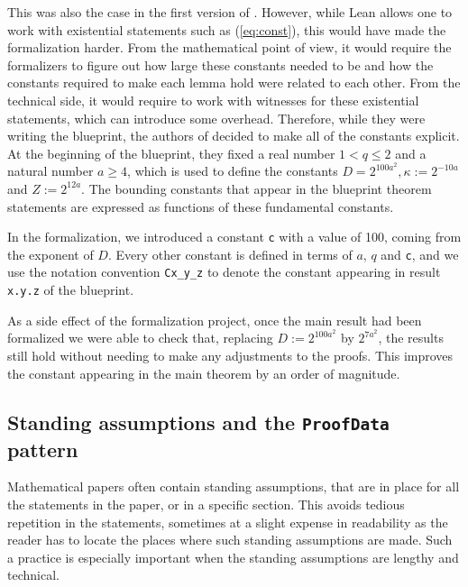 \documentclass[12pt]{amsart}
\newcommand{\lean}[1]{\texttt{#1}}
\begin{document}
This was also the case in the first version of \cite{ThieleCarlesonPreprint}. However, while Lean allows one to work with existential statements such as (\ref{eq:const}), this would have made the formalization harder. From the mathematical point of view, it would require the formalizers to figure out how large these constants needed to be and how the constants required to make each lemma hold were related to each other. From the technical side, it would require to work with witnesses for these existential statements, which can introduce some overhead.
Therefore, while they were writing the blueprint, the authors of \cite{ThieleCarlesonPreprint} decided to make all of the constants explicit. At the beginning of the blueprint, they fixed a real number $1 < q \le 2$ and a natural number $a \ge 4$, which is used to define the constants $D = 2^{100a^2}, \kappa := 2 ^{-10a}$ and $Z := 2^{12a}$. The bounding constants that appear in the blueprint theorem statements are expressed as functions of these fundamental constants.

In the formalization, we introduced a constant \lean{c} with a value of 100, coming from the exponent of $D$.
Every other constant is defined in terms of $a$, $q$ and \lean{c}, and we use the notation convention \lean{Cx_y_z} to denote the constant appearing in result \lean{x.y.z} of the blueprint.

As a side effect of the formalization project, once the main result had been formalized we were able to check that, replacing $D := 2^{100a^2}$ by $2^{7a^2}$, the results still hold without needing to make any adjustments to the proofs. This improves the constant appearing in the main theorem by an order of magnitude.


\subsection{Standing assumptions and the \texttt{ProofData} pattern}\label{subsec:proof_data}

Mathematical papers often contain standing assumptions, that are in place for
all the statements in the paper, or in a specific section. This avoids
tedious repetition in the statements, sometimes at a slight expense in
readability as the reader has to locate the places where such standing
assumptions are made. Such a practice is especially important when the
standing assumptions are lengthy and technical.
\end{document}
